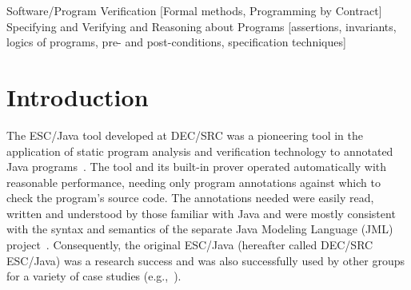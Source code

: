 \documentclass{acm_proc_article-sp}
\newif\ifpdf
\begin{document}
\newcommand{\myhref}[2]{\ifpdf\href{#1}{#2}\else\htmladdnormallinkfoot{#2}{#1}\fi}

\maketitle
\begin{abstract}
  The ESC/Java tool was a lauded advance in effective static checking
  of realistic Java programs, but has become out-of-date with respect
  to Java and the Java Modeling Language (JML).  The ESC/Java2
  project, whose progress is described in this paper, builds on the
  final release of ESC/Java from DEC/SRC in several ways.  It parses
  all of JML, thus can be used with the growing body of JML-annotated
  Java code; it has improved static checking capabilities, thus is
  becoming more complete and less unsound with each new release; and
  it has been designed, constructed, and documented in such a way as
  to improve the tool's availability to both users and researchers.
  It is intended that ESC/Java2 be used for further research in
  annotation and verification, for larger-scale case studies of
  annotation and verification, and for studies in programmer
  productivity that may result from integration with other tools that
  work with JML and Java.
\end{abstract}

                {Software/Program Verification}
                [Formal methods, Programming by Contract]
                {Specifying and Verifying and Reasoning about Programs}
                [assertions, invariants, logics of programs,
                pre- and post-conditions, specification techniques]




\section{Introduction}

The ESC/Java tool developed at DEC/SRC was a pioneering tool in the
application of static program analysis and verification technology to
annotated Java programs~\cite{ESCJava}.  The tool and its built-in
prover operated automatically with reasonable performance, needing
only program annotations against which to check the program's source
code.  The annotations needed were easily read, written and understood
by those familiar with Java and were mostly consistent with the syntax
and semantics of the separate Java Modeling Language (JML)
project~\cite{Leavens-etal00,jmlpapers}.  Consequently, the original
ESC/Java (hereafter called DEC/SRC ESC/Java) was a research success
and was also successfully used by other groups for a variety of case
studies (e.g.,~\cite{Hub03,HOP04}).
\end{document}
